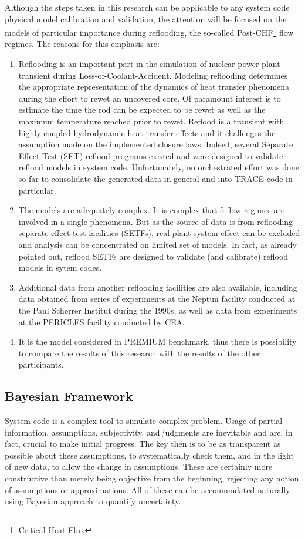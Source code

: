 \documentclass[11pt,titlepage]{article}
\begin{document}
Although the steps taken in this research can be applicable to any system code physical model calibration and validation, the attention will be focused on the models of particular importance during reflooding, the so-called Post-CHF\footnote{Critical Heat Flux} flow regimes. 
The reasons for this emphasis are:
\begin{enumerate}
	\item Reflooding is an important part in the simulation of nuclear power plant transient during Loss-of-Coolant-Accident. 
	Modeling reflooding determines the appropriate representation of the dynamics of heat transfer phenomena during the effort to rewet an uncovered core. 
	Of paramount interest is to estimate the time the rod can be expected to be rewet as well as the maximum temperature reached prior to rewet. 
	Reflood is a transient with highly coupled hydrodynamic-heat transfer effects and it challenges the assumption made on the implemented closure laws. 
	Indeed, several Separate Effect Test (SET) reflood programs existed and were designed to validate reflood models in system code. 
	Unfortunately, no orchestrated effort was done so far to consolidate the generated data in general and into TRACE code in particular.
	\item The models are adequately complex. 
	It is complex that 5 flow regimes are involved in a single phenomena. 
	But as the source of data is from reflooding separate effect test facilities (SETFs), real plant system effect can be excluded and analysis can be concentrated on limited set of models.
	In fact, as already pointed out, reflood SETFs are designed to validate (and calibrate) reflood models in sytem codes.
	\item Additional data from another reflooding facilities are also available, including data obtained from series of experiments at the Neptun facility conducted at the Paul Scherrer Institut during the 1990s, as well as data from experiments at the PERICLES facility conducted by CEA.
	\item It is the model considered in PREMIUM benchmark, thus there is possibility to compare the results of this research with the results of the other participants.
\end{enumerate}

\subsection{Bayesian Framework}

System code is a complex tool to simulate complex problem. 
Usage of partial information, assumptions, subjectivity, and judgments are inevitable and are, in fact, crucial to make initial progress. 
The key then is to be as transparent as possible about these assumptions, to systematically check them, and in the light of new data, to allow the change in assumptions. 
These are certainly more constructive than merely being objective from the beginning, rejecting any notion of assumptions or approximations. 
All of these can be accommodated naturally using Bayesian approach to quantify uncertainty.
\end{document}
